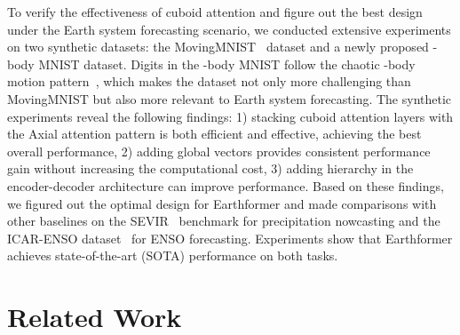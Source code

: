 \documentclass{article}
\def\nbody{-body MNIST}
\begin{document}
To verify the effectiveness of cuboid attention and figure out the best design under the Earth system forecasting scenario, we conducted extensive experiments on two synthetic datasets: the MovingMNIST~\cite{shi2015convolutional} dataset and a newly proposed \nbody{} dataset. Digits in the \nbody{} follow the chaotic -body motion pattern~\cite{mj2006three}, which makes the dataset not only more challenging than MovingMNIST but also more relevant to Earth system forecasting. The synthetic experiments reveal the following findings: 1) stacking cuboid attention layers with the Axial attention pattern is both efficient and effective, achieving the best overall performance, 2) adding global vectors provides consistent performance gain without increasing the computational cost, 3) adding hierarchy in the encoder-decoder architecture can improve performance. 
Based on these findings, we figured out the optimal design for Earthformer and made comparisons with other baselines on the SEVIR~\cite{veillette2020sevir} benchmark for precipitation nowcasting and the ICAR-ENSO dataset~\cite{ham2019deep} for ENSO forecasting. Experiments show that Earthformer achieves state-of-the-art (SOTA) performance on both tasks.









\section{Related Work}
\end{document}
